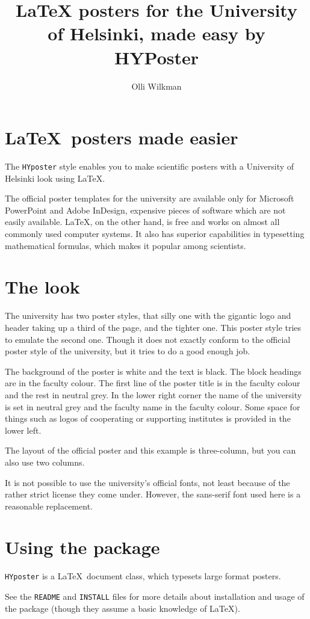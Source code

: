 \documentclass[a0paper,smallertitle]{HYposter}
\title{\LaTeX{} posters for the University of Helsinki, made easy by HYPoster}
\author{Olli Wilkman}
\affiliation{Department of Physics, University of Helsinki}
\begin{document}
\section*{\LaTeX~posters made easier}

The \texttt{HYposter} style enables you to make scientific posters with a
University of Helsinki look using \LaTeX.

The official poster templates for the university are available only for
Microsoft PowerPoint and Adobe InDesign, expensive pieces of software which are
not easily available. \LaTeX, on the other hand, is free and works on almost
all commonly used computer systems. It also has superior capabilities in
typesetting mathematical formulas, which makes it popular among scientists.


\section*{The look}

The university has two poster styles, that silly one with the gigantic logo and
header taking up a third of the page, and the tighter one. This poster style
tries to emulate the second one. Though it does not exactly conform to the
official poster style of the university, but it tries to do a good enough job.

The background of the poster is white and the text is black. The block headings
are in the faculty colour. The first line of the poster title is in the faculty
colour and the rest in neutral grey. In the lower right corner the name of the
university is set in neutral grey and the faculty name in the faculty colour.
Some space for things such as logos of cooperating or supporting institutes is
provided in the lower left.

The layout of the official poster and this example is three-column, but you can
also use two columns.

It is not possible to use the university's official fonts, not least because of
the rather strict license they come under. However, the sans-serif font used
here is a reasonable replacement.


\section*{Using the package}

\texttt{HYposter} is a \LaTeX~document class, which typesets large format
posters.

See the \texttt{README} and \texttt{INSTALL} files for more details about
installation and usage of the package (though they assume a basic knowledge of
\LaTeX).
\end{document}
